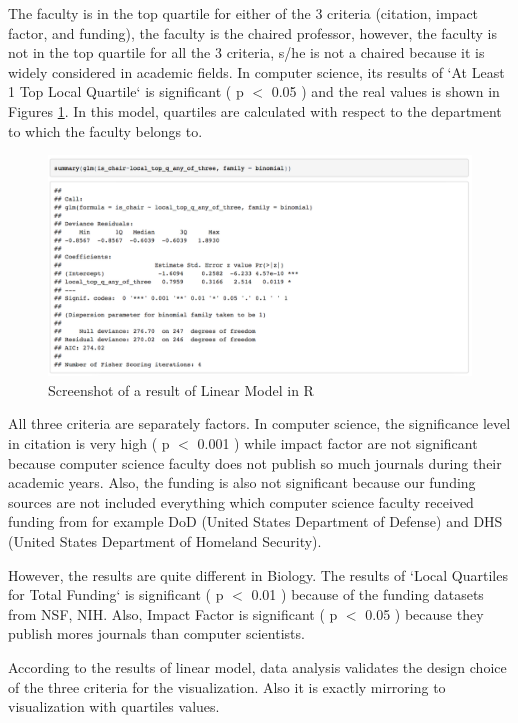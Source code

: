 The faculty is in the top quartile for either of the 3 criteria (citation, impact factor, and funding), the faculty is the chaired professor, however, the faculty is not in the top quartile for all the 3 criteria, s/he is not a chaired because it is widely considered in academic fields. In computer science, its results of `At Least 1 Top Local Quartile` is significant ( p $<$ 0.05 ) and the real values is shown in Figures \ref{fig:CS-Local-Quartile}. In this model, quartiles are calculated with respect to the department to which the faculty belongs to.

 \begin{figure}
  \centering
  \includegraphics[width=\textwidth]{figures/CS-Local-Quartile}
  \caption{Screenshot of a result of Linear Model in R}
  \label{fig:CS-Local-Quartile}
\end{figure}

All three criteria are separately factors. In computer science, the significance level in citation is very high ( p $<$ 0.001 ) while impact factor are not significant because computer science faculty does not publish so much journals during their academic years. Also, the funding is also not significant because our funding sources are not included everything which computer science faculty received funding from for example DoD (United States Department of Defense) and DHS (United States Department of Homeland Security).

However, the results are quite different in Biology. The results of `Local Quartiles for Total Funding` is significant ( p $<$ 0.01 ) because of the funding datasets from NSF, NIH. Also, Impact Factor is significant ( p $<$ 0.05 ) because they publish mores journals than computer scientists.

According to the results of linear model, data analysis validates the design choice of the three criteria for the visualization. Also it is exactly mirroring to visualization with quartiles values.

